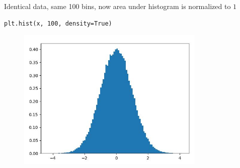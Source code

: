 \documentclass[english,14pt]{beamer}
\begin{document}

\begin{frame}[fragile]

\frametitle{}

Identical data, same 100 bins, now area under histogram is normalized to $1$

\begin{lstlisting}[style=CStyle,basicstyle=\scriptsize]
plt.hist(x, 100, density=True)
\end{lstlisting}

\begin{figure}[ht]
	\centering
	\includegraphics[width=0.8\textwidth]{figures/hist100BinsDensity}
\end{figure}

\end{frame}

\end{document}

